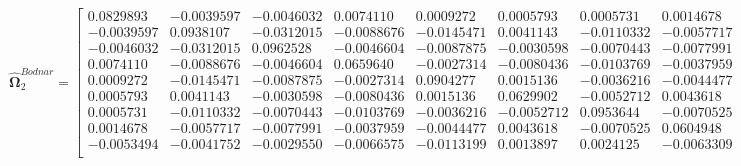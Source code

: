 \documentclass{article}\usepackage[]{graphicx}\usepackage[]{xcolor}
\def\bs{\boldsymbol}
\begin{document}
 \[
 \widehat{\bs{\Omega}}_{2}^{Bodnar} = 
 
  \begin{bmatrix}
 
 
 
 0.0829893 & -0.0039597 & -0.0046032 & 0.0074110 & 0.0009272 & 0.0005793 & 0.0005731 & 0.0014678 & -0.0053494\\
 
 -0.0039597 & 0.0938107 & -0.0312015 & -0.0088676 & -0.0145471 & 0.0041143 & -0.0110332 & -0.0057717 & -0.0041752\\
 
 -0.0046032 & -0.0312015 & 0.0962528 & -0.0046604 & -0.0087875 & -0.0030598 & -0.0070443 & -0.0077991 & -0.0029550\\
 
 0.0074110 & -0.0088676 & -0.0046604 & 0.0659640 & -0.0027314 & -0.0080436 & -0.0103769 & -0.0037959 & -0.0066575\\
 
 0.0009272 & -0.0145471 & -0.0087875 & -0.0027314 & 0.0904277 & 0.0015136 & -0.0036216 & -0.0044477 & -0.0113199\\
 
 0.0005793 & 0.0041143 & -0.0030598 & -0.0080436 & 0.0015136 & 0.0629902 & -0.0052712 & 0.0043618 & 0.0013897\\
 
 0.0005731 & -0.0110332 & -0.0070443 & -0.0103769 & -0.0036216 & -0.0052712 & 0.0953644 & -0.0070525 & 0.0024125\\
 
 0.0014678 & -0.0057717 & -0.0077991 & -0.0037959 & -0.0044477 & 0.0043618 & -0.0070525 & 0.0604948 & -0.0063309\\
 
 -0.0053494 & -0.0041752 & -0.0029550 & -0.0066575 & -0.0113199 & 0.0013897 & 0.0024125 & -0.0063309 & 0.0878430\\
 \end{bmatrix}
  \]
 
\end{document}
